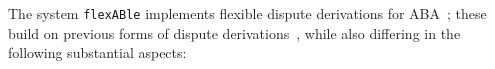 \documentclass[conference]{IEEEtran}
\newcommand{\flexable}{\texttt{flexABle}\xspace}
\begin{document}


The system \flexable implements flexible dispute derivations for ABA~\cite{DillerGG21}; these build on previous forms of dispute derivations~\cite{Toni13,CravenT16}, while also differing in the following substantial aspects:
\end{document}
